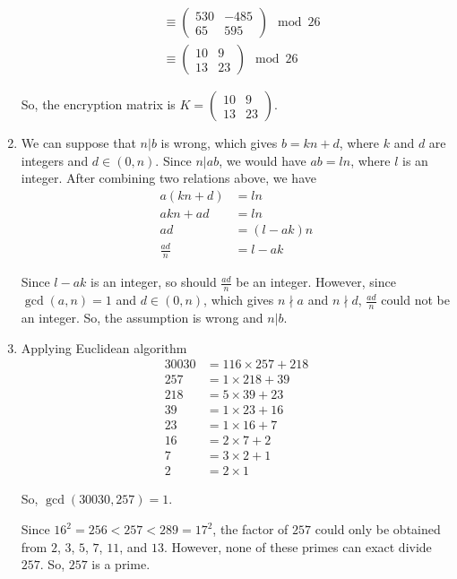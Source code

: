 \documentclass[11pt,a4paper]{article}
\begin{document}
\begin{enumerate}
\begin{align*}
		&\equiv \begin{pmatrix} 530 & -485 \\ 65 & 595 \end{pmatrix} \mod 26 \\
		&\equiv \begin{pmatrix} 10 & 9 \\ 13 & 23 \end{pmatrix} \mod 26
	\end{align*}
	\par So, the encryption matrix is $K = \begin{pmatrix} 10 & 9 \\ 13 & 23 \end{pmatrix}$.
	
	\item We can suppose that $n | b$ is wrong, which gives $b = kn + d$, where $k$ and $d$ are integers and $d \in (0, n)$. Since $n|ab$, we would have $ab = ln$, where $l$ is an integer. After combining two relations above, we have
	\begin{align*}
		a(kn + d) &= ln \\
		akn + ad &= ln \\
		ad &= (l - ak)n \\
		\frac{ad}{n} &= l - ak
	\end{align*}
	\par Since $l - ak$ is an integer, so should $\frac{ad}{n}$ be an integer. However, since $\gcd(a, n) = 1$ and $d \in (0, n)$, which gives $n \nmid a$ and $n \nmid d$, $\frac{ad}{n}$ could not be an integer. So, the assumption is wrong and $n | b$.
	
	\item Applying Euclidean algorithm
	\begin{align*}
		30030 &= 116 \times 257 + 218 \\
		257 &= 1 \times 218 + 39 \\
		218 &= 5 \times 39 + 23 \\
		39 &= 1 \times 23 + 16 \\
		23 &= 1 \times 16 + 7 \\
		16 &= 2 \times 7 + 2 \\
		7 &= 3 \times 2 + 1 \\
		2 &= 2 \times 1
	\end{align*}
	\par So, $\gcd(30030, 257) = 1$.
	\par Since $16^{2} = 256 < 257 < 289 = 17^{2}$, the factor of $257$ could only be obtained from $2$, $3$, $5$, $7$, $11$, and $13$. However, none of these primes can exact divide $257$. So, $257$ is a prime.
	

\end{enumerate}
\end{document}
